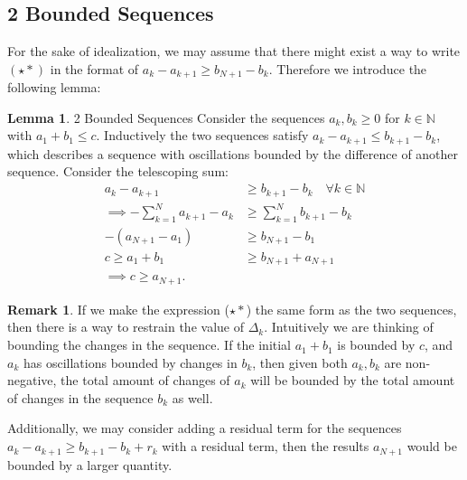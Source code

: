 \documentclass[]{article}
\theoremstyle{definition}
\newtheorem{lemma}{Lemma}[subsection]  %
\newtheorem{remark}{Remark}[subsection]
{
    \newtheorem{assumption}{Assumption}
}
\begin{document}
    \subsection{2 Bounded Sequences}
        For the sake of idealization, we may assume that there might exist a way to write $(\star*)$ in the format of $a_k- a_{k + 1}\ge b_{N+ 1} - b_k$. Therefore we introduce the following lemma: 
        \begin{lemma}{2 Bounded Sequences}
            Consider the sequences $a_k, b_k \ge 0$ for $k\in \mathbb N$ with $a_1 + b_1 \le c$. Inductively the two sequences satisfy $a_{k} - a_{k + 1} \le b_{k + 1} - b_k$, which describes a sequence with oscillations bounded by the difference of another sequence. Consider the telescoping sum: 
            \begin{align*}
                a_{k} - a_{k + 1} 
                &\ge b_{k + 1} - b_k \quad \forall k \in \mathbb N
                \\
                \implies
                -\sum_{k = 1}^{N}
                a_{k + 1} - a_k 
                &\ge 
                \sum_{k = 1}^{N} b_{k + 1} - b_k
                \\
                - (a_{N + 1} - a_1) 
                &\ge b_{N + 1} - b_1
                \\
                c\ge a_1 + b_1
                &\ge
                b_{N + 1} + a_{N +1}
                \\
                \implies c \ge a_{N+1}. 
            \end{align*}
        \end{lemma}
        \begin{remark}
            If we make the expression ($\star*$) the same form as the two sequences, then there is a way to restrain the value of $\Delta_k$. Intuitively we are thinking of bounding the changes in the sequence. If the initial $a_1 + b_1$ is bounded by $c$, and $a_k$ has oscillations bounded by changes in $b_k$, then given both $a_k, b_k$ are non-negative, the total amount of changes of $a_k$ will be bounded by the total amount of changes in the sequence $b_k$ as well. 
            \par
            Additionally, we may consider adding a residual term for the sequences $a_{k} - a_{k + 1} \ge b_{k + 1} - b_k + r_k$ with a residual term, then the results $a_{N + 1}$ would be bounded by a larger quantity.
        \end{remark}
\end{document}

